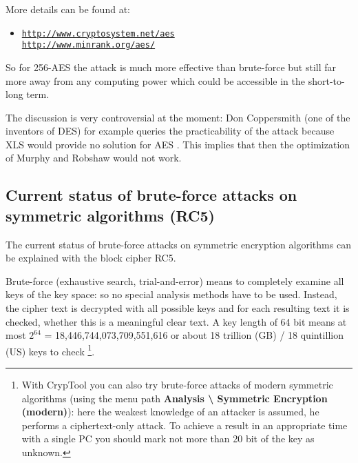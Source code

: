 More details can be found at:
\vspace{-10pt}
\begin{itemize}
  \item[] \href{http://www.cryptosystem.net/aes}
               {\texttt{http://www.cryptosystem.net/aes}}\\
          \href{http://www.minrank.org/aes/}
               {\texttt{http://www.minrank.org/aes/}}
\end{itemize}

So for 256-AES the attack is much more effective than brute-force but still far more away from any computing power which could be accessible in the short-to-long term. 

The discussion is very controversial at the moment: Don Coppersmith (one of the
inventors of DES) for example queries the practicability of the attack because
XLS would provide no solution for AES \cite{Coppersmith2002}. This implies that
then the optimization of Murphy and Robshaw \cite{Robshaw2002b} would not work.


\subsection{Current status of brute-force attacks on
symmetric algorithms (RC5)}
\label{Brute-force-gegen-Symmetr}

The current status of brute-force attacks on symmetric encryption algorithms can be explained with the block cipher RC5.

Brute-force (exhaustive search, trial-and-error) means to completely examine all keys of the key space: so no special analysis methods have to be used. Instead, the cipher text is decrypted with all possible keys and for each resulting text it is checked, whether this is a meaningful clear text. A key length of 64 bit means at most $2^{64}$ = 18,446,744,073,709,551,616 or about 18 trillion (GB) / 18 quintillion (US)  keys to check%
\footnote{%
    With CrypTool you can also try brute-force attacks
    of modern symmetric algorithms (using the menu path
    {\bf Analysis \textbackslash{} Symmetric Encryption (modern)}): here
    the weakest knowledge of an attacker is assumed, he performs a 
    ciphertext-only attack.
    To achieve a result in an appropriate time with a single PC you should 
    mark not more than 20 bit of the key as unknown.
}.

